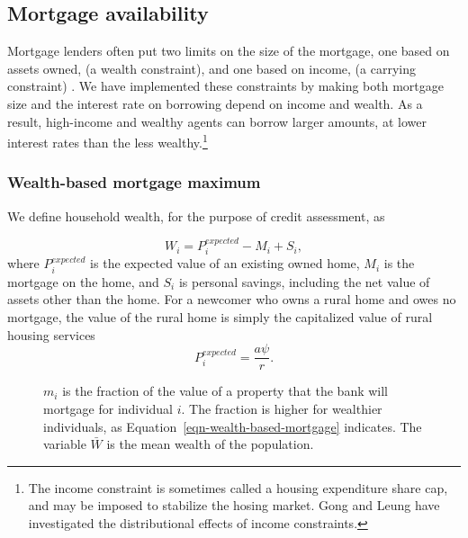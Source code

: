 {\color{black}

\subsection{Mortgage availability} \label{sec:mortgage-availability}
Mortgage lenders often put two limits on the size of the mortgage, one based on assets owned, (a {wealth constraint}), and one based on income, (a {carrying constraint}) \cite{CanadaHousingSupply2022}. We have implemented these constraints by making both mortgage size and the interest rate on borrowing depend on income and wealth. As a result, high-income and wealthy agents can borrow larger amounts, at lower interest rates than the less wealthy.\footnote{The income constraint is sometimes called a housing expenditure share cap, and may be imposed to stabilize the hosing market. Gong and Leung \cite{gongDoesSpaceMatter2024} have investigated the distributional effects of income constraints.} %


\subsubsection{Wealth-based mortgage maximum} 
We define household wealth, for the purpose of credit assessment, as

\begin{equation} 
W_i= P^{expected}_i - M_i  +S_i, 
\end{equation}
where $P^{expected}_i$ is the expected value of an existing owned home, $M_i$ is the mortgage on the home, and $S_i$ is personal savings, including the net value of assets other than the home. %
For a newcomer who owns a rural home and owes no mortgage, the value of the rural home is simply the capitalized value of rural housing services
\begin{equation} 
P^{expected}_i = \frac{a\psi}{r}.
\end{equation}


    \begin{figure}[htb]
    \begin{center}
    
    \end{center}
    \caption[Individual borrowing ratio $m_i$ as a function of wealth]{$m_i$ is the fraction of the value of a property that the bank will mortgage for individual $i$. The fraction is higher for wealthier individuals, as  Equation~\ref{eqn-wealth-based-mortgage}  indicates. The variable $\bar W$ is the mean wealth of the population. }
    \label{fig-borrowing-ratio}
    \end{figure}


}
